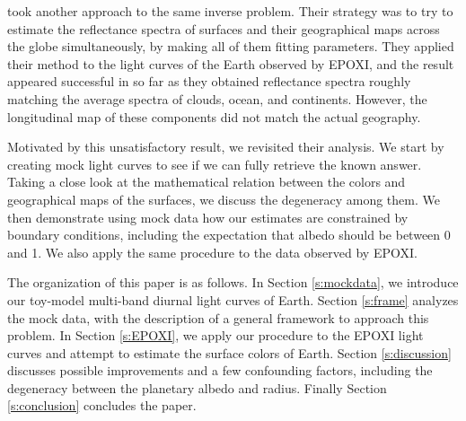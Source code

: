 \documentclass[iop,numberedappendix,apj]{emulateapj}
\begin{document}
\citet{Cowan2013} took another approach to the same inverse problem. 
Their strategy was to try to estimate the reflectance spectra of surfaces and their geographical maps across the globe simultaneously, by making all of them fitting parameters. 
They applied their method to the light curves of the Earth observed by EPOXI, and the result appeared successful in so far as they obtained reflectance spectra roughly matching the average spectra of clouds, ocean, and continents. 
However, the longitudinal map of these components did not match the actual geography.  

Motivated by this unsatisfactory result, we revisited their analysis. 
We start by creating mock light curves to see if we can fully retrieve the known answer. 
Taking a close look at the mathematical relation between the colors and geographical maps of the surfaces, we discuss the degeneracy among them. 
We then demonstrate using mock data how our estimates are constrained by boundary conditions, including the expectation that albedo should be between 0 and 1. 
We also apply the same procedure to the data observed by EPOXI. 

The organization of this paper is as follows. 
In Section \ref{s:mockdata}, we introduce our toy-model multi-band diurnal light curves of Earth. 
Section \ref{s:frame} analyzes the mock data, with the description of a general framework to approach this problem. 
In Section \ref{s:EPOXI}, we apply our procedure to the EPOXI light curves and attempt to estimate the surface colors of Earth. 
Section \ref{s:discussion} discusses possible improvements and a few confounding factors, including the degeneracy between the planetary albedo and radius. 
Finally Section \ref{s:conclusion} concludes the paper. 
\end{document}
